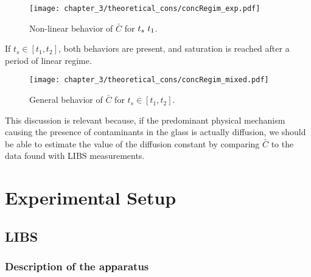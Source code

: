 \begin{figure}[H]
   \centering
   \texttt{[image: chapter\_3/theoretical\_cons/concRegim\_exp.pdf]} 
    \vspace*{-30pt}
   \caption{Non-linear behavior of $\bar{C}$ for $\protect t_s ~ t_1$.}
   \label{fig:c_bar_non_linear}
\end{figure}
If $t_s \in [t_1, t_2]$, both behaviors are present, and saturation is reached after a period of linear regime.
\begin{figure}[H]
    \centering
    \texttt{[image: chapter\_3/theoretical\_cons/concRegim\_mixed.pdf]} 
     \vspace*{-30pt}
    \caption{General behavior of $\bar{C}$ for  $t_s \in [t_1, t_2]$.}
    \label{fig:c_bar_mixed}
 \end{figure}
This discussion is relevant because, if the predominant physical mechanism causing the presence of contaminants in the glass is actually diffusion, we should be able to estimate the value of the diffusion constant by comparing $\bar{C}$ to the data found with LIBS measurements.

\chapter{Experimental Setup}
\label{ch:experimental_setup}


\section{LIBS}
\label{sec:LIBS_apparatus}

\subsection{Description of the apparatus}
\label{sec:Description_of_the_apparatus}

